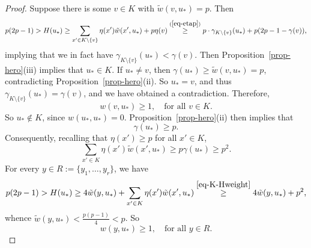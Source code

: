 \documentclass[10pt,a4paper]{article}
\theoremstyle{definition}
\begin{document}
\begin{proof}
	Suppose there is some $v \in K$ with $\tilde{w}(v,u_*) = p$.
	Then
	$$
	p(2p-1)>H(u_*)\ge \sum_{x' \in K\setminus\{v\}}\eta(x')\tilde{w}(x',u_*) + p\eta(v) \stackrel{(\ref{eq-etap})}{\ge} p\cdot\gamma_{K\setminus \{v\}}(u_*) + p(2p-1-\gamma(v)),
	$$
	implying that we in fact have $\gamma_{K\setminus\{v\}}(u_*) <  \gamma(v)$. Then Proposition~\ref{prop-hero}(iii) implies that $u_* \in K$.
	If $u_* \neq v$, then $\gamma(u_*) \geq \tilde{w}(v,u_*) = p$, contradicting Proposition~\ref{prop-hero}(ii).
	So $u_*=v$, and thus $\gamma_{K\setminus\{v\}}(u_*) = \gamma(v)$, and we have obtained a contradiction.
	Therefore,
	\begin{equation}\label{eq-K-linked}
		w(v,u_*) \geq 1,\quad\text{for all }v \in K.
	\end{equation}
	So $u_* \notin K$, since $w(u_*,u_*)=0$. Proposition~\ref{prop-hero}(ii) then implies that \begin{equation}\label{gammau*}
		\gamma(u_*) \geq p.
	\end{equation}
	Consequently, recalling that $\eta(x') \geq p$ for all $x' \in K$,
	\begin{equation}\label{eq-K-Hweight}
		\sum_{x' \in K}\eta(x')\tilde{w}(x',u_*) \geq p\gamma(u_*)\ge p^2.
	\end{equation}
	For every $y \in R := \lbrace y_1,\ldots,y_r\rbrace$, we have
	$$
	p(2p-1)>H(u_*)\ge 4\tilde{w}(y,u_*)+\sum_{x' \in K}\eta(x')\tilde{w}(x',u_*)\stackrel{\eqref{eq-K-Hweight}}{\ge} 4\tilde{w}(y,u_*)+p^2,
	$$
	whence $\tilde{w}(y,u_*)<\frac{p(p-1)}{4}<p$. So \begin{equation}\label{eq-R-linked}
		w(y,u_*) \geq 1,\quad\text{for all }y \in R.
	\end{equation}
	

\end{proof}
\end{document}
